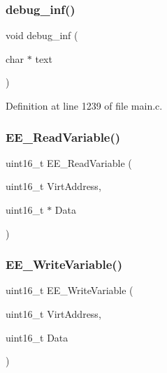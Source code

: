 \mbox{\label{main_8c_afb3a2ffa2014ea9d37ba91c6072d18aa}} 
\subsubsection{debug\+\_\+inf()}
{\footnotesize\ttfamily void debug\+\_\+inf (\begin{DoxyParamCaption}\item[{char $\ast$}]{text }\end{DoxyParamCaption})}



Definition at line 1239 of file main.\+c.

\mbox{\label{main_8c_a0776e2e16f54d3a675e4f2f401703a85}} 
\subsubsection{E\+E\+\_\+\+Read\+Variable()}
{\footnotesize\ttfamily uint16\+\_\+t E\+E\+\_\+\+Read\+Variable (\begin{DoxyParamCaption}\item[{uint16\+\_\+t}]{Virt\+Address,  }\item[{uint16\+\_\+t $\ast$}]{Data }\end{DoxyParamCaption})}

\mbox{\label{main_8c_a516e9ced7438b9452c72884aa1df5915}} 
\subsubsection{E\+E\+\_\+\+Write\+Variable()}
{\footnotesize\ttfamily uint16\+\_\+t E\+E\+\_\+\+Write\+Variable (\begin{DoxyParamCaption}\item[{uint16\+\_\+t}]{Virt\+Address,  }\item[{uint16\+\_\+t}]{Data }\end{DoxyParamCaption})}

\mbox{\label{main_8c_ae31a6837673e8e8ee1012f92c4c77a58}} 
